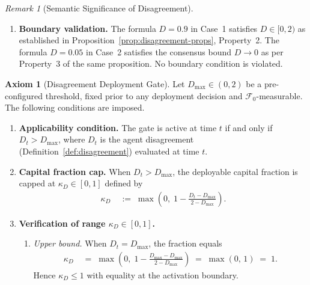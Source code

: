 \documentclass[12pt,openany]{book}
\numberwithin{equation}{chapter}
\theoremstyle{plain}
\theoremstyle{definition}
\newtheorem{axiom}[theorem]{Axiom}
\theoremstyle{remark}
\newtheorem{remark}[theorem]{Remark}
\numberwithin{equation}{chapter}
\theoremstyle{plain}
\begin{document}
\begin{remark}[Semantic Significance of Disagreement]
\begin{enumerate}
  \item \textbf{Boundary validation.}
        The formula $D = 0.9$ in Case~1 satisfies
        $D \in [0, 2)$ as established in
        Proposition~\ref{prop:disagreement-props},
        Property~2.  The formula $D = 0.05$ in Case~2
        satisfies the consensus bound $D \to 0$
        as per Property~3 of the same proposition.
        No boundary condition is violated.
\end{enumerate}
\end{remark}

\begin{axiom}[Disagreement Deployment Gate]
\label{ax:disagreement-gate}
Let $D_{\max} \in (0,2)$ be a pre-configured threshold,
fixed prior to any deployment decision and
$\mathcal{F}_0$-measurable.
The following conditions are imposed.

\begin{enumerate}
  \item \textbf{Applicability condition.}
        The gate is active at time $t$ if and only if
        $D_t > D_{\max}$, where $D_t$ is the agent
        disagreement (Definition~\ref{def:disagreement})
        evaluated at time $t$.

  \item \textbf{Capital fraction cap.}
        When $D_t > D_{\max}$, the deployable capital
        fraction is capped at $\kappa_D \in [0,1]$ defined
        by
        \begin{align}
          \kappa_D
          &\;:=\;
          \max\!\left(0,\;
            1 - \frac{D_t - D_{\max}}{2 - D_{\max}}
          \right).
          \label{eq:disagreement-gate}
        \end{align}

  \item \textbf{Verification of range $\kappa_D \in [0,1]$.}
        \begin{enumerate}
          \item \emph{Upper bound.}
                When $D_t = D_{\max}$, the fraction equals
                \begin{align}
                  \kappa_D
                  &\;=\; \max\!\left(0,\;
                    1 - \frac{D_{\max} - D_{\max}}{2-D_{\max}}
                  \right)
                  \;=\; \max(0,\, 1)
                  \;=\; 1.
                \end{align}
                Hence $\kappa_D \leq 1$ with equality at
                the activation boundary.


\end{enumerate}
\end{enumerate}
\end{axiom}
\end{document}
